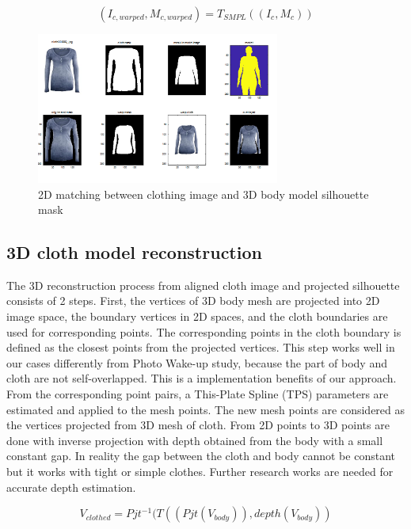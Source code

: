\begin{equation}
(I_{c, warped}, M_{c, warped})  = T_{SMPL} ((I_c, M_c))
\end{equation}


\begin{figure}[t]
\centering
\includegraphics[width=8cm]{figures/2dmatching.png}   %
\caption{2D matching between clothing image and 3D body model silhouette mask}
\label{fig:2DmatchingOfClothAndBody}
\end{figure}


\subsection{3D cloth model reconstruction }


The 3D reconstruction process from aligned cloth image and projected silhouette consists of 2 steps. First, the vertices of 3D body mesh are projected into 2D image space, the boundary vertices in 2D spaces, and the cloth boundaries are used for corresponding points. The corresponding points in the cloth boundary is defined as the closest points from the projected vertices. This step works well in our cases differently from Photo Wake-up\cite{Weng2018PhotoW3} study, because the part of body and cloth are not self-overlapped. This is a implementation benefits of our approach. From the corresponding point pairs, a This-Plate Spline (TPS)\cite{Bookstein1989PrincipalWT} parameters are estimated and applied to the mesh points. The new mesh points are considered as the vertices projected from 3D mesh of cloth. From 2D points to 3D points are done with inverse projection with depth obtained from the body with a small constant gap. In reality the gap between the cloth and body cannot be constant but it works with tight or simple clothes. Further research works are needed for accurate depth estimation.   


\begin{equation}
V_{clothed} = Pjt^{-1} ( T( (Pjt(V_{body})), depth(V_{body}) )
\end{equation}


